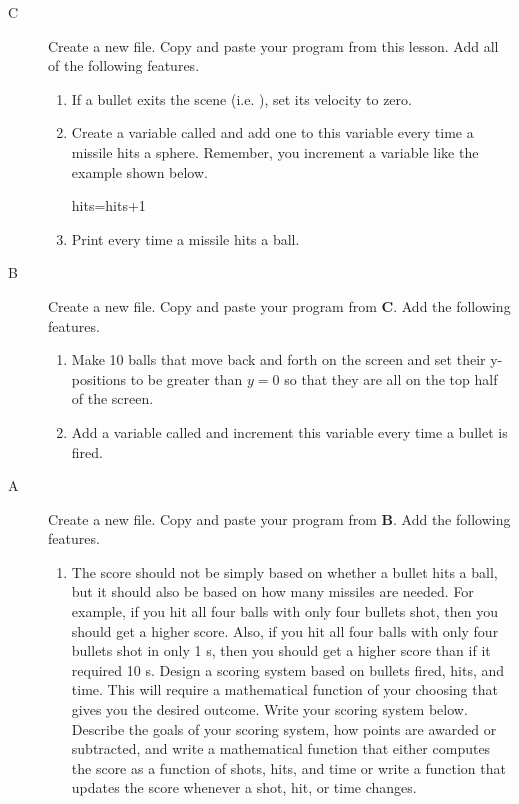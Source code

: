 \begin{description}
	\item[C] Create a new file. Copy and paste your program from this lesson. 
	Add all of the following features.
\begin{enumerate}
	\item If a bullet exits the scene (i.e. ), set its velocity to zero.
	\item Create a variable called  and add one to this variable every time a missile hits a sphere. Remember, you increment a variable like the example shown below.
\begin{myvpython}
	hits=hits+1	
\end{myvpython}
	\item Print  every time a missile hits a ball.
\end{enumerate}

	\item[B] Create a new file. Copy and paste your program from {\bf C}. Add the following features.

\begin{enumerate}
	\item Make 10 balls that move back and forth on the screen and set their y-positions to be greater than $y=0$ so that they are all on the top half of the screen.
	\item Add a variable called  and increment this variable every time a bullet is fired.
\end{enumerate}

	\item[A] Create a new file. Copy and paste your program from {\bf B}. Add the following features.

\begin{enumerate}
	\item The score should not be simply based on whether a bullet hits a ball, but it should also be based on how many missiles are needed. For example, if you hit all four balls with only four bullets shot, then you should get a higher score. Also, if you hit all four balls with only four bullets shot in only 1 s, then you should get a higher score than if it required 10 s. Design a scoring system  based on bullets fired, hits, and time. This will require a mathematical function of your choosing that gives you the desired outcome. Write your scoring system below. Describe the goals of your scoring system, how points are awarded or subtracted, and write a mathematical function that either computes the score as a function of shots, hits, and time or write a function that updates the score whenever a shot, hit, or time changes. 


\end{enumerate}
\end{description}
